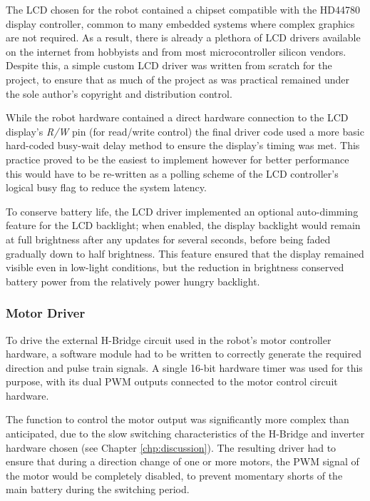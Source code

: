 The LCD chosen for the robot contained a chipset compatible with the HD44780 display controller, common to many embedded systems where complex graphics are not required. As a result, there is already a plethora of LCD drivers available on the internet from hobbyists and from most microcontroller silicon vendors. Despite this, a simple custom LCD driver was written from scratch for the project, to ensure that as much of the project as was practical remained under the sole author's copyright and distribution control.

While the robot hardware contained a direct hardware connection to the LCD display's \textit{R/W} pin (for read/write control) the final driver code used a more basic hard-coded busy-wait delay method to ensure the display's timing was met. This practice proved to be the easiest to implement however for better performance this would have to be re-written as a polling scheme of the LCD controller's logical busy flag to reduce the system latency.

To conserve battery life, the LCD driver implemented an optional auto-dimming feature for the LCD backlight; when enabled, the display backlight would remain at full brightness after any updates for several seconds, before being faded gradually down to half brightness. This feature ensured that the display remained visible even in low-light conditions, but the reduction in brightness conserved battery power from the relatively power hungry backlight.

\FloatBarrier
\subsubsection{Motor Driver}

To drive the external H-Bridge circuit used in the robot's motor controller hardware, a software module had to be written to correctly generate the required direction and pulse train signals. A single 16-bit hardware timer was used for this purpose, with its dual PWM outputs connected to the motor control circuit hardware.

The function to control the motor output was significantly more complex than anticipated, due to the slow switching characteristics of the H-Bridge and inverter hardware chosen (see Chapter \ref{chp:discussion}). The resulting driver had to ensure that during a direction change of one or more motors, the PWM signal of the motor would be completely disabled, to prevent momentary shorts of the main battery during the switching period.

